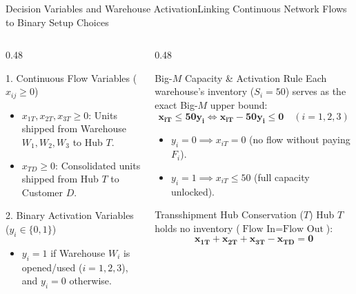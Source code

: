 \documentclass[aspectratio=169]{beamer}
\begin{document}
\begin{frame}{Decision Variables and Warehouse Activation}{Linking Continuous Network Flows to Binary Setup Choices}
\begin{columns}[T,onlytextwidth]
\begin{column}{0.48\textwidth}
  \begin{block}{1. Continuous Flow Variables ($x_{ij} \ge 0$)}
    \scriptsize
    \begin{itemize}\setlength{\itemsep}{2pt}
      \item $x_{1T}, x_{2T}, x_{3T} \ge 0$: Units shipped from Warehouse $W_1, W_2, W_3$ to Hub $T$.
      \item $x_{TD} \ge 0$: Consolidated units shipped from Hub $T$ to Customer $D$.
    \end{itemize}
  \end{block}
  \begin{block}{2. Binary Activation Variables ($y_i \in \{0,1\}$)}
    \scriptsize
    \begin{itemize}\setlength{\itemsep}{2pt}
      \item $y_i = 1$ if Warehouse $W_i$ is opened/used ($i=1,2,3$), and $y_i = 0$ otherwise.
    \end{itemize}
  \end{block}
\end{column}
\begin{column}{0.48\textwidth}
  \begin{alertblock}{Big-$M$ Capacity \& Activation Rule}
    \scriptsize
    Each warehouse's inventory ($S_i = 50$) serves as the exact Big-$M$ upper bound:
    \[
      \mathbf{x_{iT} \le 50 y_i \iff x_{iT} - 50 y_i \le 0} \quad (i=1,2,3)
    \]
    \begin{itemize}\setlength{\itemsep}{1pt}
      \item $y_i = 0 \implies x_{iT} = 0$ (no flow without paying $F_i$).
      \item $y_i = 1 \implies x_{iT} \le 50$ (full capacity unlocked).
    \end{itemize}
  \end{alertblock}
  \begin{exampleblock}{Transshipment Hub Conservation ($T$)}
    \scriptsize
    Hub $T$ holds no inventory ($\text{Flow In} = \text{Flow Out}$):
    \[
      \mathbf{x_{1T} + x_{2T} + x_{3T} - x_{TD} = 0}
    \]
  \end{exampleblock}
\end{column}
\end{columns}
\end{frame}
\end{document}
